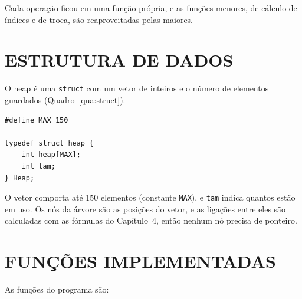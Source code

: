 \documentclass[12pt,openany,oneside,a4paper,english,brazil,sumario=tradicional]{abntex2}
\begin{document}
Cada operação ficou em uma função própria, e as funções menores, de cálculo de índices e de troca, são reaproveitadas pelas maiores.

\section{ESTRUTURA DE DADOS}

O heap é uma \texttt{struct} com um vetor de inteiros e o número de elementos guardados (Quadro~\ref{qua:struct}).

\begin{quadro}[htb]
\caption{\label{qua:struct}Estrutura que representa o heap}
\begin{Verbatim}
#define MAX 150

typedef struct heap {
    int heap[MAX];
    int tam;
} Heap;
\end{Verbatim}
\end{quadro}

O vetor comporta até 150 elementos (constante \texttt{MAX}), e \texttt{tam} indica quantos estão em uso. Os nós da árvore são as posições do vetor, e as ligações entre eles são calculadas com as fórmulas do Capítulo~4, então nenhum nó precisa de ponteiro.

\section{FUNÇÕES IMPLEMENTADAS}

As funções do programa são:
\end{document}
